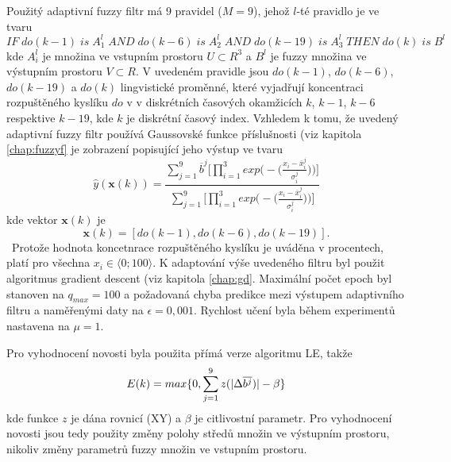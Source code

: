 \par
Použitý adaptivní fuzzy filtr má 9 pravidel ($M=9$), jehož $l$-té pravidlo je ve tvaru
\begin{equation}
    IF\;do(k-1)\; is\; A_1^l\;AND\;do(k-6)\;is\;A_2^l\;AND\;do(k-19)\;is\;A_3^l\;THEN\;do(k)\;is\;B^l
\end{equation}
kde $A_i^l$ je množina ve vstupním prostoru $U \subset R^3$ a $B^l$ je fuzzy množina ve výstupním prostoru $V \subset R$. V uvedeném pravidle jsou $do(k-1)$, $do(k-6)$, $do(k-19)$ a $do(k)$ lingvistické proměnné, které vyjadřují koncentraci rozpuštěného kyslíku $do$ v v diskrétních časových okamžicích $k$, $k-1$, $k-6$ respektive $k-19$, kde $k$ je diskrétní časový index. Vzhledem k tomu, že uvedený adaptivní fuzzy filtr používá Gaussovské funkce příslušnosti (viz kapitola \ref{chap:fuzzyf} je zobrazení popisující jeho výstup ve tvaru
\begin{equation}
    \hat{y}(\textbf{x}(k))=\frac{\sum_{j=1}^9 \overline{b}^j\Big[\prod_{i=1}^3 exp\Big(-\Big(\frac{x_i-\overline{x}_i^j}{\sigma_i^j}\Big)\Big)\Big]}{\sum_{j=1}^9 \Big[\prod_{i=1}^3 exp\Big(-\Big(\frac{x_i-\overline{x}_i^j}{\sigma_i^j}\Big)\Big)\Big]}
\end{equation}
kde vektor $\textbf{x}(k)$ je
\begin{equation}
    \textbf{x}(k)=[do(k-1),do(k-6),do(k-19)].
\end{equation}\
Protože hodnota koncetnrace rozpuštěného kyslíku je uváděna v procentech, platí pro všechna $x_i\in \langle 0;100\rangle$. K adaptování výše uvedeného filtru byl použit algoritmus gradient descent (viz kapitola \ref{chap:gd}. Maximální počet epoch byl stanoven na $q_{max}=100$ a požadovaná chyba predikce mezi výstupem adaptivního filtru a naměřenými daty na $\epsilon=0,001$. Rychlost učení byla během experimentů nastavena na $\mu=1$.
\par
Pro vyhodnocení novosti byla použita přímá verze algoritmu LE, takže
\begin{equation}\label{eq:le_putida}
    E(k)=max\{0, \sum_{j=1}^9 z(\lvert\Delta \overline{b^j})\rvert-\beta\}
\end{equation}
kde funkce $z$ je dána rovnicí (XY) a $\beta$ je citlivostní parametr. Pro vyhodnocení novosti jsou tedy použity změny polohy středů množin ve výstupním prostoru, nikoliv změny parametrů fuzzy množin ve vstupním prostoru.

